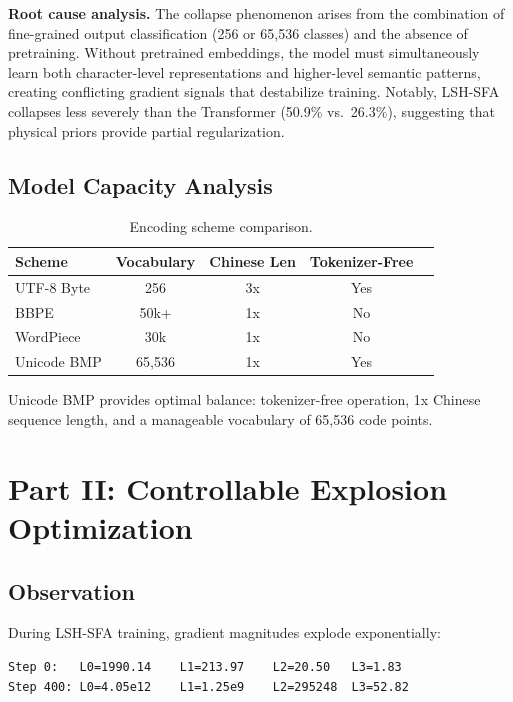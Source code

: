 \documentclass{article}
\begin{document}
\textbf{Root cause analysis.} The collapse phenomenon arises from the combination of fine-grained output classification (256 or 65,536 classes) and the absence of pretraining. Without pretrained embeddings, the model must simultaneously learn both character-level representations and higher-level semantic patterns, creating conflicting gradient signals that destabilize training. Notably, LSH-SFA collapses less severely than the Transformer (50.9\% vs.\ 26.3\%), suggesting that physical priors provide partial regularization.

\subsection{Model Capacity Analysis}

\begin{table}[h]
\centering
\caption{Encoding scheme comparison.}
\label{tab:encoding}
\begin{tabular}{lcccc}
\toprule
\textbf{Scheme} & \textbf{Vocabulary} & \textbf{Chinese Len} & \textbf{Tokenizer-Free} \\
\midrule
UTF-8 Byte & 256 & 3x & Yes \\
BBPE & 50k+ & 1x & No \\
WordPiece & 30k & 1x & No \\
Unicode BMP & 65,536 & 1x & Yes \\
\bottomrule
\end{tabular}
\end{table}

Unicode BMP provides optimal balance: tokenizer-free operation, 1x Chinese sequence length, and a manageable vocabulary of 65,536 code points.

\section{Part II: Controllable Explosion Optimization}

\subsection{Observation}

During LSH-SFA training, gradient magnitudes explode exponentially:

\begin{verbatim}
Step 0:   L0=1990.14    L1=213.97    L2=20.50   L3=1.83
Step 400: L0=4.05e12    L1=1.25e9    L2=295248  L3=52.82
\end{verbatim}
\end{document}
